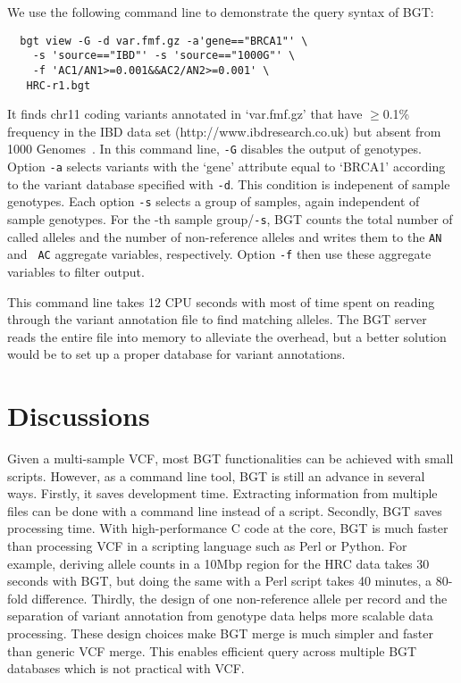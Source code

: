 \documentclass{bioinfo}
\begin{document}
We use the following command line to demonstrate the query syntax of BGT:
\begin{center}\footnotesize
\begin{verbatim}
  bgt view -G -d var.fmf.gz -a'gene=="BRCA1"' \
    -s 'source=="IBD"' -s 'source=="1000G"' \
    -f 'AC1/AN1>=0.001&&AC2/AN2>=0.001' \
   HRC-r1.bgt
\end{verbatim}
\end{center}
It finds chr11 coding variants annotated in `var.fmf.gz' that have $\ge$0.1\%
frequency in the IBD data set (http://www.ibdresearch.co.uk) but absent from
1000 Genomes~\citep{1000-Genomes-Project-Consortium:2012aa}. In this command line, {\tt -G} disables the output of genotypes.
Option {\tt -a} selects variants with the `gene' attribute equal to `BRCA1'
according to the variant database specified with {\tt -d}. This condition
is indepenent of sample genotypes. Each option {\tt -s} selects a group of
samples, again independent of sample genotypes.  For the -th sample
group/{\tt -s}, BGT counts the total number of called alleles and the number of
non-reference alleles and writes them to the {\tt AN\char35} and {\tt
AC\char35} aggregate variables, respectively. Option {\tt -f} then use these
aggregate variables to filter output.

This command line takes 12 CPU seconds with most of time spent on reading
through the variant annotation file to find matching alleles. The BGT server
reads the entire file into memory to alleviate the overhead, but a better
solution would be to set up a proper database for variant annotations.

\section{Discussions}

Given a multi-sample VCF, most BGT functionalities can be achieved with small
scripts. However, as a command line tool, BGT is still an advance in several
ways. Firstly, it saves development time. Extracting information from multiple
files can be done with a command line instead of a script.  Secondly,
BGT saves processing time. With high-performance C code at the core, BGT is
much faster than processing VCF in a scripting language such as Perl or Python.
For example, deriving allele counts in a 10Mbp region for the HRC data takes 30
seconds with BGT, but doing the same with a Perl script takes 40 minutes, a
80-fold difference. Thirdly, the design of one non-reference allele per record
and the separation of variant annotation from genotype data helps more scalable
data processing. These design choices make BGT merge is much simpler and faster
than generic VCF merge. This enables efficient query across multiple BGT
databases which is not practical with VCF.
\end{document}
